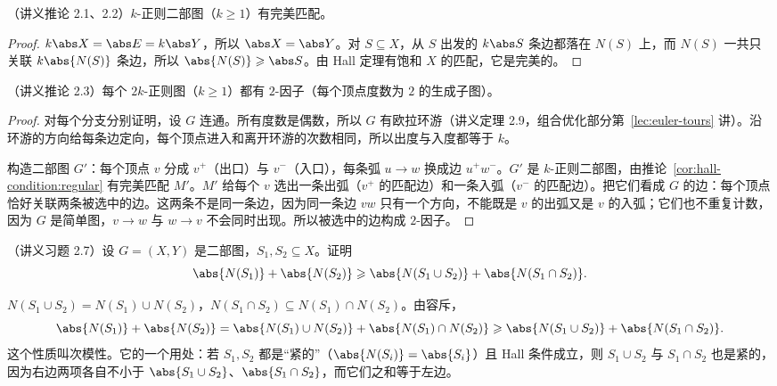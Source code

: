 \begin{corollary}\label{cor:hall-condition:regular}
（讲义推论 2.1、2.2）$k$-正则二部图（$k\geqslant1$）有完美匹配。
\end{corollary}
\begin{proof}
$k\abs X=\abs E=k\abs Y$，所以 $\abs X=\abs Y$。对 $S\subseteq X$，从 $S$ 出发的 $k\abs S$ 条边都落在 $N(S)$ 上，而 $N(S)$ 一共只关联 $k\abs{N(S)}$ 条边，所以 $\abs{N(S)}\geqslant\abs S$。由 Hall 定理有饱和 $X$ 的匹配，它是完美的。
\end{proof}

\begin{corollary}[Petersen]\label{cor:hall-condition:two-factor}
（讲义推论 2.3）每个 $2k$-正则图（$k\geqslant1$）都有 $2$-因子（每个顶点度数为 $2$ 的生成子图）。
\end{corollary}
\begin{proof}
对每个分支分别证明，设 $G$ 连通。所有度数是偶数，所以 $G$ 有欧拉环游（讲义定理 2.9，组合优化部分第~\ref{lec:euler-tours} 讲）。沿环游的方向给每条边定向，每个顶点进入和离开环游的次数相同，所以出度与入度都等于 $k$。

构造二部图 $G'$：每个顶点 $v$ 分成 $v^+$（出口）与 $v^-$（入口），每条弧 $u\to w$ 换成边 $u^+w^-$。$G'$ 是 $k$-正则二部图，由推论~\ref{cor:hall-condition:regular} 有完美匹配 $M'$。$M'$ 给每个 $v$ 选出一条出弧（$v^+$ 的匹配边）和一条入弧（$v^-$ 的匹配边）。把它们看成 $G$ 的边：每个顶点恰好关联两条被选中的边。这两条不是同一条边，因为同一条边 $vw$ 只有一个方向，不能既是 $v$ 的出弧又是 $v$ 的入弧；它们也不重复计数，因为 $G$ 是简单图，$v\to w$ 与 $w\to v$ 不会同时出现。所以被选中的边构成 $2$-因子。
\end{proof}

\begin{workedexample}\label{we:hall-condition:submodular}
（讲义习题 2.7）设 $G=(X,Y)$ 是二部图，$S_1,S_2\subseteq X$。证明
\[
\abs{N(S_1)}+\abs{N(S_2)}\geqslant\abs{N(S_1\cup S_2)}+\abs{N(S_1\cap S_2)} .
\]
\end{workedexample}
\begin{solution}
$N(S_1\cup S_2)=N(S_1)\cup N(S_2)$，$N(S_1\cap S_2)\subseteq N(S_1)\cap N(S_2)$。由容斥，
\[
\abs{N(S_1)}+\abs{N(S_2)}=\abs{N(S_1)\cup N(S_2)}+\abs{N(S_1)\cap N(S_2)}\geqslant\abs{N(S_1\cup S_2)}+\abs{N(S_1\cap S_2)} .
\]
这个性质叫次模性。它的一个用处：若 $S_1,S_2$ 都是“紧的”（$\abs{N(S_i)}=\abs{S_i}$）且 Hall 条件成立，则 $S_1\cup S_2$ 与 $S_1\cap S_2$ 也是紧的，因为右边两项各自不小于 $\abs{S_1\cup S_2}$、$\abs{S_1\cap S_2}$，而它们之和等于左边。
\end{solution}

